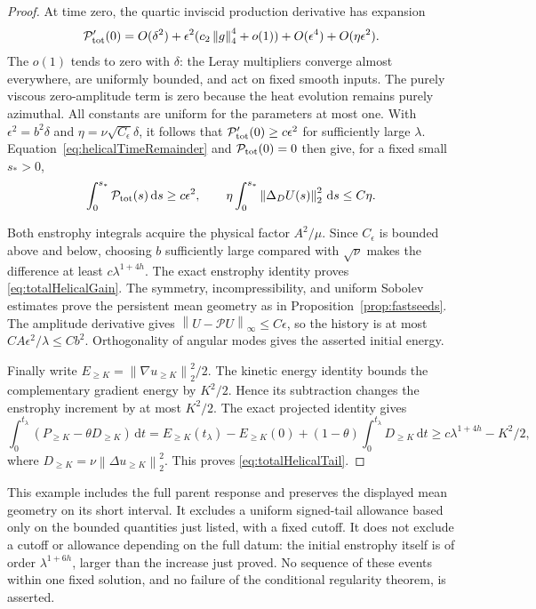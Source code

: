 \documentclass[11pt]{article}
\theoremstyle{remark}
\newcommand{\PP}{\mathcal P}
\newcommand{\dd}{\,\mathrm d}
\newcommand{\norm}[1]{\left\lVert#1\right\rVert}
\begin{document}
\begin{proof}
At time zero, the quartic inviscid production derivative has expansion
\[
 \mathcal P_{\rm tot}'(0)=O(\delta^2)+\epsilon^2(c_2\norm g_4^4+o(1))
                    +O(\epsilon^4)+O(\eta\epsilon^2).
\]
The $o(1)$ tends to zero with $\delta$: the Leray multipliers converge
almost everywhere, are uniformly bounded, and act on fixed smooth
inputs. The purely viscous zero-amplitude term is zero because the
heat evolution remains purely azimuthal. All constants are uniform
for the parameters at most one. With $\epsilon^2=b^2\delta$ and
$\eta=\nu\sqrt{C_\epsilon}\delta$, it follows that
$\mathcal P_{\rm tot}'(0)\geq c\epsilon^2$ for sufficiently large $\lambda$.
Equation~\eqref{eq:helicalTimeRemainder} and $\mathcal P_{\rm tot}(0)=0$
then give, for a fixed small $s_*>0$,
\[
 \int_0^{s_*}\mathcal P_{\rm tot}(s)\dd s\geq c\epsilon^2,
 \qquad
 \eta\int_0^{s_*}\norm{\Delta_D U(s)}_2^2\dd s\leq C\eta.
\]

Both enstrophy integrals acquire the physical factor $A^2/\mu$.
Since $C_\epsilon$ is bounded above and below, choosing $b$ sufficiently
large compared with $\sqrt\nu$ makes the difference at least
$c\lambda^{1+4h}$. The exact enstrophy identity proves
\eqref{eq:totalHelicalGain}. The symmetry, incompressibility, and
uniform Sobolev estimates prove the persistent mean geometry as in
Proposition~\ref{prop:fastseeds}. The amplitude derivative gives
$\norm{U-\PP U}_\infty\leq C\epsilon$, so the history is at most
$CA\epsilon^2/\lambda\leq Cb^2$. Orthogonality of angular modes
gives the asserted initial energy.

Finally write $E_{\geq K}=\norm{\nabla u_{\geq K}}_2^2/2$.
The kinetic energy identity bounds the complementary gradient energy
by $K^2/2$. Hence its subtraction changes the enstrophy increment by
at most $K^2/2$. The exact projected identity gives
\[
 \int_0^{t_\lambda}(P_{\geq K}-\theta D_{\geq K})\dd t
 =E_{\geq K}(t_\lambda)-E_{\geq K}(0)
                   +(1-\theta)\int_0^{t_\lambda}D_{\geq K}\dd t
 \geq c\lambda^{1+4h}-K^2/2,
\]
where $D_{\geq K}=\nu\norm{\Delta u_{\geq K}}_2^2$.
This proves \eqref{eq:totalHelicalTail}.
\end{proof}

This example includes the full parent response and preserves the displayed
mean geometry on its short interval. It excludes a uniform signed-tail
allowance based only on the bounded quantities just listed, with a fixed
cutoff. It does not exclude a cutoff or allowance depending on the full
datum: the initial enstrophy itself is of order $\lambda^{1+6h}$,
larger than the increase just proved. No sequence of these events within
one fixed solution, and no failure of the conditional regularity theorem,
is asserted.
\end{document}
